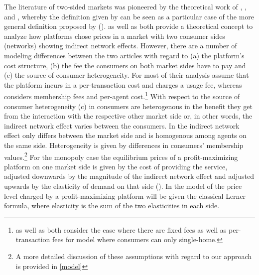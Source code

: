 \documentclass[10pt,a4paper]{scrreprt}
\begin{document}
The literature of two-sided markets was pioneered by the theoretical work of \cite{caillaud_chicken_2003}, \cite{rochet_platform_2003}, \cite{evans_antitrust_2003} and \cite{armstrong_competition_2006}, whereby the definition given by \cite{evans_antitrust_2003} can be seen as a particular case of the more general definition proposed by \cite{rochet_platform_2003} (\cite{filistrucchi_identifying_2012}). \cite{rochet_platform_2003} as well as \cite{armstrong_competition_2006} both provide a theoretical concept to analyze how platforms chose prices in a market with two consumer sides (networks) showing indirect network effects. However, there are a number of modeling differences between the two articles with regard to (a) the platform's cost structure, (b) the fee the consumers on both market sides have to pay and (c) the source of consumer heterogeneity. For most of their analysis \cite{rochet_platform_2003} assume that the platform incurs in a per-transaction cost and charges a usage fee, whereas \cite{armstrong_competition_2006} considers membership fees and per-agent cost.\footnote{\cite{rochet_platform_2003} as well as \cite{armstrong_competition_2006} both consider the case where there are fixed fees as well as per-transaction fees for model where consumers can only single-home.} With respect to the source of consumer heterogeneity (c) in \cite{rochet_platform_2003} consumers are heterogenous in the benefit they get from the interaction with the respective other market side or, in other words, the indirect network effect varies between the consumers. In \cite{armstrong_competition_2006} the indirect network effect only differs between the market side and is homogenous among agents on the same side. Heterogeneity is given by differences in consumers' membership values.\footnote{A more detailed discussion of these assumptions with regard to our approach is provided in \ref{model}} For the monopoly case the equilibrium prices of a profit-maximizing platform on one market side is given by the cost of providing the service, adjusted downwards by the magnitude of the indirect network effect and adjusted upwards by the elasticity of demand on that side (\cite{armstrong_competition_2006}). In the model of \cite{rochet_platform_2003} the price level charged by a profit-maximizing platform will be given the classical Lerner formula, where elasticity is the sum of the two elasticities in each side.  
 
\end{document}
